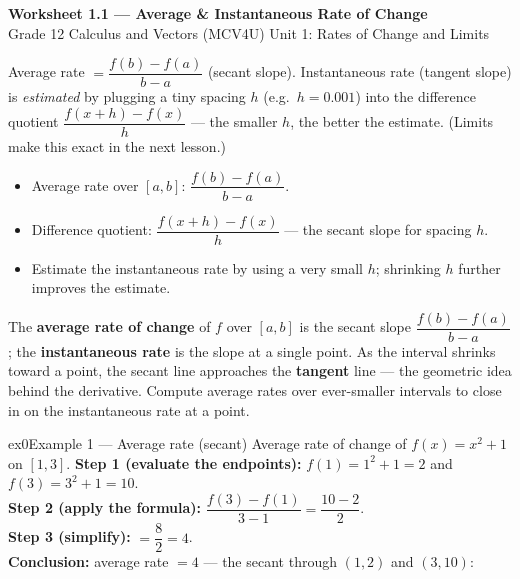 \documentclass[11pt]{article}
\begin{document}
\begin{center}
{\LARGE\bfseries\color{titleblue}Worksheet 1.1 --- Average \& Instantaneous Rate of Change}\\[2pt]
{\small Grade 12 Calculus and Vectors (MCV4U) \textperiodcentered{} Unit 1: Rates of Change and Limits}
\end{center}

\begin{ideabox}
Average rate $=\dfrac{f(b)-f(a)}{b-a}$ (secant slope). Instantaneous rate (tangent slope) is \emph{estimated} by plugging a tiny spacing $h$ (e.g.\ $h=0.001$) into the difference quotient $\dfrac{f(x+h)-f(x)}{h}$ --- the smaller $h$, the better the estimate. (Limits make this exact in the next lesson.)
\begin{itemize}[leftmargin=*,itemsep=2pt]
  \item Average rate over $[a,b]$: $\dfrac{f(b)-f(a)}{b-a}$.
  \item Difference quotient: $\dfrac{f(x+h)-f(x)}{h}$ --- the secant slope for spacing $h$.
  \item Estimate the instantaneous rate by using a very small $h$; shrinking $h$ further improves the estimate.
\end{itemize}
\end{ideabox}

\begin{learnbox}
The \textbf{average rate of change} of $f$ over $[a,b]$ is the secant slope $\dfrac{f(b)-f(a)}{b-a}$; the \textbf{instantaneous rate} is the slope at a single point.
As the interval shrinks toward a point, the secant line approaches the \textbf{tangent} line — the geometric idea behind the derivative.
Compute average rates over ever-smaller intervals to close in on the instantaneous rate at a point.
\end{learnbox}


\begin{example}{ex0}{Example 1 --- Average rate (secant)}
Average rate of change of $f(x)=x^2+1$ on $[1,3]$.\soln
\textbf{Step 1 (evaluate the endpoints):} $f(1)=1^2+1=2$ and $f(3)=3^2+1=10$.\\[3pt]
\textbf{Step 2 (apply the formula):} $\dfrac{f(3)-f(1)}{3-1}=\dfrac{10-2}{2}$.\\[3pt]
\textbf{Step 3 (simplify):} $=\dfrac{8}{2}=4$.\\[3pt]
\textbf{Conclusion:} average rate $=4$ --- the secant through $(1,2)$ and $(3,10)$:
\end{example}
\end{document}
